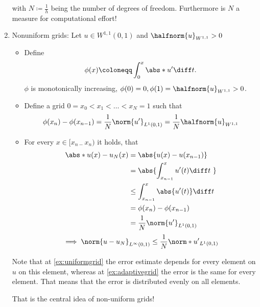 \begin{example}
\begin{enumerate}[label = \Roman*)]
			with $N \coloneqq \frac{1}{h}$ being the number of degrees of freedom. Furthermore is $N$ a measure for computational effort!
    \item Nonuniform grids: \label{ex:adaptivegrid}
      Let $u \in W^{1,1}(0,1)$ and $\halfnorm{u}_{W^{1,1}}>0$
			\begin{itemize}
				\item Define
					\begin{equation*}
            \phi(x) \coloneqq \int_{0}^x \abs*{u^\prime} \diff t.
					\end{equation*}
          $\phi$ is monotonically increasing, $\phi(0)=0,\phi(1)=\halfnorm{u}_{W^{1,1}} > 0$.
				\item Define a grid $0 = x_{0} < x_{1}< \dots < x_{N} = 1$ such that
					\begin{equation*}
            \phi(x_{n}) - \phi(x_{n-1}) = \frac{1}{N} \norm{u^\prime}_{L^1(0,1)}= \frac{1}{N} \halfnorm{u}_{W^{1,1}}
					\end{equation*}
				\item For every $x \in [x_{n-}x_{n})$ it holds, that
					\begin{align*}
            \abs*{u(x)-u_{N}(x)}&= \abs{u(x)-u(x_{n-1})}\\
                                &= \abs{\int_{x_{n-1}}^{x} u^\prime(t) \diff t\ }\\
                                &\leq \int_{x_{n-1}}^{x} \abs{u^\prime(t)} \diff t\\\
									   &= \phi(x_{n}) - \phi(x_{n-1}) \\
                     &= \frac{1}{N} \norm{u^\prime}_{L^{1}(0,1)}
					\end{align*}
					\begin{equation*}
            \implies \norm{u - u_{N}}_{L^{\infty}(0,1)} \leq \frac{1}{N} \norm*{u^\prime}_{L^{1}(0,1)}
					\end{equation*}
			\end{itemize}
      Note that at \ref{ex:uniformgrid} the error estimate depends for every element on $u$ on this element, whereas at \ref{ex:adaptivegrid} the error is the same for every element. That means that the error is distributed evenly on all elements.

      That is the central idea of non-uniform grids!
	\end{enumerate}
\end{example}
